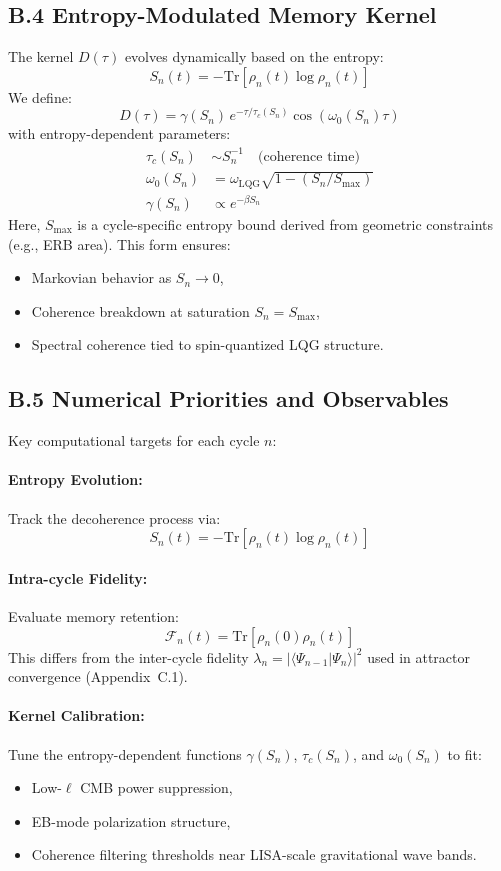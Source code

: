\subsection*{B.4 Entropy-Modulated Memory Kernel}

The kernel \( D(\tau) \) evolves dynamically based on the entropy:
\[
S_n(t) = -\mathrm{Tr}[\rho_n(t) \log \rho_n(t)]
\]
We define:
\[
D(\tau) = \gamma(S_n) \, e^{-\tau/\tau_c(S_n)} \cos(\omega_0(S_n) \tau)
\]
with entropy-dependent parameters:
\begin{align*}
\tau_c(S_n) &\sim S_n^{-1} \quad \text{(coherence time)} \\
\omega_0(S_n) &= \omega_{\text{LQG}} \sqrt{1 - \left(S_n / S_{\text{max}}\right)} \\
\gamma(S_n) &\propto e^{-\beta S_n}
\end{align*}
Here, \( S_{\text{max}} \) is a cycle-specific entropy bound derived from geometric constraints (e.g., ERB area). This form ensures:
\begin{itemize}
  \item Markovian behavior as \( S_n \to 0 \),
  \item Coherence breakdown at saturation \( S_n = S_{\text{max}} \),
  \item Spectral coherence tied to spin-quantized LQG structure.
\end{itemize}

\subsection*{B.5 Numerical Priorities and Observables}

Key computational targets for each cycle \( n \):

\paragraph{Entropy Evolution:}
Track the decoherence process via:
\[
S_n(t) = -\mathrm{Tr}[\rho_n(t) \log \rho_n(t)]
\]

\paragraph{Intra-cycle Fidelity:}
Evaluate memory retention:
\[
\mathcal{F}_n(t) = \mathrm{Tr}[\rho_n(0)\rho_n(t)]
\]
This differs from the inter-cycle fidelity \( \lambda_n = |\langle \Psi_{n-1} | \Psi_n \rangle|^2 \) used in attractor convergence (Appendix~C.1).

\paragraph{Kernel Calibration:}
Tune the entropy-dependent functions \( \gamma(S_n) \), \( \tau_c(S_n) \), and \( \omega_0(S_n) \) to fit:
\begin{itemize}
  \item Low-\( \ell \) CMB power suppression,
  \item EB-mode polarization structure,
  \item Coherence filtering thresholds near LISA-scale gravitational wave bands.
\end{itemize}

